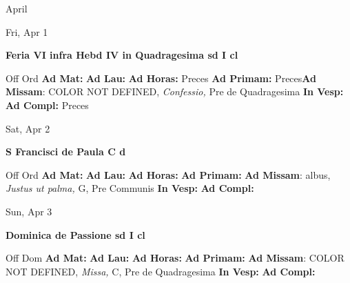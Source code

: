 \documentclass[10pt]{memoir}
\begin{document}
\begin{center}
\pagebreak
\thispagestyle{empty}
{\Huge April}
\end{center}
                    
\begin{center}
\begin{minipage}{3.5in}
\vspace{2em}
\begin{center}Fri, Apr 1
\end{center}
\textbf{ \large Feria VI infra Hebd IV in Quadragesima 
\textnormal{\normalsize sd I cl}}

\begin{justify}Off Ord
\textbf{Ad Mat: }
\textbf{Ad Lau: }
\textbf{Ad Horas: }Preces
\textbf{Ad Primam: }Preces\textbf{Ad Missam}: COLOR NOT DEFINED, \textit{Confessio,} Pre de Quadragesima
\textbf{In Vesp: }
\textbf{Ad Compl: }Preces
\end{justify}
\end{minipage}
\end{center}

\begin{center}
\begin{minipage}{3.5in}
\vspace{2em}
\begin{center}Sat, Apr 2
\end{center}
\textbf{ \large S Francisci de Paula C
\textnormal{\normalsize d}}

\begin{justify}Off Ord
\textbf{Ad Mat: }
\textbf{Ad Lau: }
\textbf{Ad Horas: }
\textbf{Ad Primam: }\textbf{Ad Missam}: albus, \textit{Justus ut palma,} G, Pre Communis
\textbf{In Vesp: }
\textbf{Ad Compl: }
\end{justify}
\end{minipage}
\end{center}

\begin{center}
\begin{minipage}{3.5in}
\vspace{2em}
\begin{center}Sun, Apr 3
\end{center}
\textbf{ \large Dominica de Passione
\textnormal{\normalsize sd I cl}}

\begin{justify}Off Dom
\textbf{Ad Mat: }
\textbf{Ad Lau: }
\textbf{Ad Horas: }
\textbf{Ad Primam: }\textbf{Ad Missam}: COLOR NOT DEFINED, \textit{Missa,} C, Pre de Quadragesima
\textbf{In Vesp: }
\textbf{Ad Compl: }
\end{justify}
\end{minipage}
\end{center}
\end{document}
